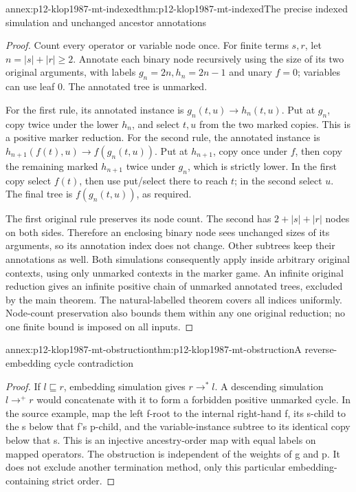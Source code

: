 \begin{annexitem}{annex:p12-klop1987-mt-indexed}{thm:p12-klop1987-mt-indexed}{The precise indexed simulation and unchanged ancestor annotations}
\begin{proof}
Count every operator or variable node once. For finite terms \(s,r\),
let \(n=|s|+|r|\geq2\). Annotate each binary node recursively
using the size of its two original arguments, with labels
\(g_n=2n,h_n=2n-1\) and unary \(f=0\); variables can use
leaf 0. The annotated tree is unmarked.

For the first rule, its annotated instance is
\(g_n(t,u)\to h_n(t,u)\). Put at \(g_n\), copy twice under
the lower \(h_n\), and select \(t,u\) from the two marked
copies. This is a positive marker reduction.
For the second rule, the annotated instance is
\(h_{n+1}(f(t),u)\to f(g_n(t,u))\).
Put at \(h_{n+1}\), copy once under \(f\), then copy the
remaining marked \(h_{n+1}\) twice under \(g_n\), which is
strictly lower. In the first copy select \(f(t)\), then use
put/select there to reach \(t\); in the second select \(u\).
The final tree is \(f(g_n(t,u))\), as required.

The first original rule preserves its node count. The second has
\(2+|s|+|r|\) nodes on both sides. Therefore an enclosing binary
node sees unchanged sizes of its arguments, so its annotation index
does not change. Other subtrees keep their annotations as well.
Both simulations consequently apply inside arbitrary original
contexts, using only unmarked contexts in the marker game. An
infinite original reduction gives an infinite positive chain of
unmarked annotated trees, excluded by the main theorem. The
natural-labelled theorem covers all indices uniformly. Node-count
preservation also bounds them within any one original reduction;
no one finite bound is imposed on all inputs.
\end{proof}
\end{annexitem}

\begin{annexitem}{annex:p12-klop1987-mt-obstruction}{thm:p12-klop1987-mt-obstruction}{A reverse-embedding cycle contradiction}
\begin{proof}
If \(l\sqsubseteq r\), embedding simulation gives \(r\to^*l\).
A descending simulation \(l\to^+r\) would concatenate with it
to form a forbidden positive unmarked cycle. In the source example,
map the left f-root to the internal right-hand f, its s-child to the
s below that f's p-child, and the variable-instance subtree to its
identical copy below that s. This is an injective ancestry-order map
with equal labels on mapped operators. The obstruction is independent
of the weights of g and p. It does not exclude another termination
method, only this particular embedding-containing strict order.
\end{proof}
\end{annexitem}

